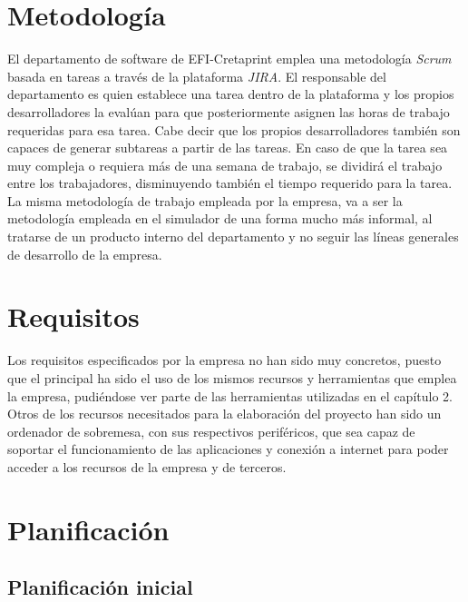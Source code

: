 \documentclass[pdftex,11pt,a4paper]{book}
\begin{document}
\section{Metodología}
El departamento de software de EFI-Cretaprint emplea una metodología \emph{Scrum} basada en tareas a través de la plataforma \emph{JIRA}. El responsable del departamento es quien establece una tarea dentro de la plataforma y los propios desarrolladores la evalúan para que posteriormente asignen las horas de trabajo requeridas para esa tarea. Cabe decir que los propios desarrolladores también son capaces de generar subtareas a partir de las tareas. En caso de que la tarea sea muy compleja o requiera más de una semana de trabajo, se dividirá el trabajo entre los trabajadores, disminuyendo también el tiempo requerido para la tarea. La misma metodología de trabajo empleada por la empresa, va a ser la metodología empleada en el simulador de una forma mucho más informal, al tratarse de un producto interno del departamento y no seguir las líneas generales de desarrollo de la empresa.

\section{Requisitos}

Los requisitos especificados por la empresa no han sido muy concretos, puesto que el principal ha sido el uso de los mismos recursos y herramientas que emplea la empresa, pudiéndose ver parte de las herramientas utilizadas en el capítulo 2. Otros de los recursos necesitados para la elaboración del proyecto han sido un ordenador de sobremesa, con sus respectivos periféricos, que sea capaz de soportar el funcionamiento de las aplicaciones y conexión a internet para poder acceder a los recursos de la empresa y de terceros.

\section{Planificación}

\subsection{Planificación inicial}
\end{document}
